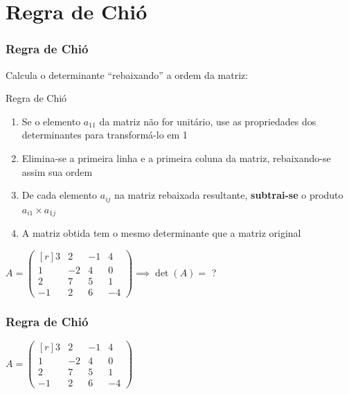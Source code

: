 \documentclass[pdftex, brazil, aspectratio=169]{beamer}
\begin{document}
\section{Regra de Chió}

\begin{frame}[t]
  \frametitle{Regra de Chió}
  Calcula o determinante ``rebaixando'' a ordem da matriz:
  \begin{block}{Regra de Chió}
    \begin{enumerate}
      \item Se o elemento $a_{11}$ da matriz não for unitário, use as
        propriedades dos determinantes para transformá-lo em 1
      \item Elimina-se a primeira linha e a primeira coluna da matriz,
        rebaixando-se assim sua ordem
      \item De cada elemento $a_{ij}$ na matriz rebaixada resultante,
        \textbf{subtrai-se} o produto $a_{i1} \times a_{1j}$
      \item A matriz obtida tem o mesmo determinante que a matriz original
    \end{enumerate}
  \end{block}
  $A = \begin{pmatrix*}[r]
    3 & 2 & -1 & 4\\
    1 & -2 & 4 & 0\\
    2 & 7 & 5 & 1\\
    -1 & 2 & 6 & -4\end{pmatrix*} \implies \det(A) = $ ?
\end{frame}

\begin{frame}[t]
  \frametitle{Regra de Chió}
  $A = \begin{pmatrix*}[r]
    3 & 2 & -1 & 4\\
    1 & -2 & 4 & 0\\
    2 & 7 & 5 & 1\\
    -1 & 2 & 6 & -4\end{pmatrix*}$
\end{frame}




\end{document}

